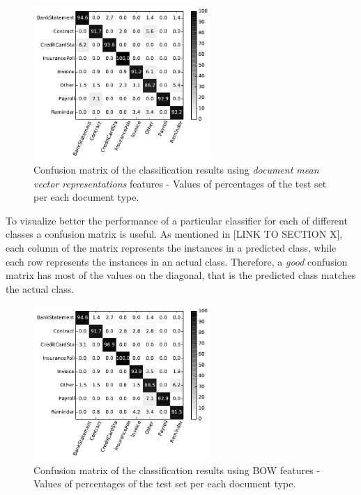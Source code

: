 \begin{figure}[!htbp]
    \centering 
    \includegraphics[width=0.6\textwidth]{images/002-xvalidaton-dmr.pdf}
    \caption{Confusion matrix of the classification results  using
      \textit{document mean vector 
      representations} features - Values of percentages of the test set per
    each document type.}
    \label{fig:confusion-matrix-dmr}
\end{figure}

To visualize better the performance of a particular classifier for each of different
classes a confusion matrix is useful. As mentioned in [LINK TO SECTION X],
each column of the matrix represents the instances in a predicted class,
while each row represents the instances in an actual class. Therefore, a
\textit{good} confusion matrix has most of the values on the diagonal, that
is the predicted class matches the actual class. 

\begin{figure}[!htbp]
    \centering
    \includegraphics[width=0.6\textwidth]{images/003-xvalidaton-bow.pdf}
    \caption{Confusion matrix of the classification results  using \ac{BOW}
      features - Values of percentages of the test set per each document type.}
    \label{fig:confusion-matrix-bow}
\end{figure}


